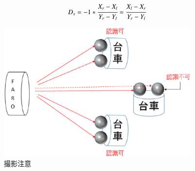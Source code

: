 \begin{equation}
D_{s} = -1*\cfrac{X_{r}-X_{l}}{Y_{r}-Y_{l}} = \cfrac{X_{l}-X_{r}}{Y_{r}-Y_{l}}
\end{equation}

\begin{figure}[htbp]
  \begin{center}
   \includegraphics[height=70mm]{figure/撮影注意.eps}
   \caption{撮影注意}
   \label{撮影注意}
  \end{center}
\end{figure}

